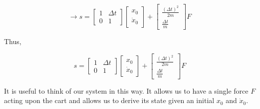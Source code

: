 \documentclass[11pt]{article}
\begin{document}
\[
\rightarrow
s =
\begin{bmatrix}
  1 & \Delta{t}\\
  0 & 1
\end{bmatrix}
\begin{bmatrix}
  x_0\\
  \dot{x}_0
\end{bmatrix}
+
\begin{bmatrix}
  \frac{(\Delta t)^2}{2m}\\
   \frac{\Delta t}{m}
\end{bmatrix}
F
\]


Thus,

\[
s
=
\begin{bmatrix}
  1 & \Delta t\\
  0 & 1
\end{bmatrix}
\begin{bmatrix}
  x_0\\
  \dot{x}_0
\end{bmatrix}
+
\begin{bmatrix}
  \frac{(\Delta t)^2}{2m}\\
  \frac{\Delta t}{m}
\end{bmatrix}
F
\]

It is useful to think of our system in this way. It allows us to have a single force $F$
acting upon the cart and allows us to derive its state given an initial $x_0$ and $\dot{x}_0$.



\end{document}

